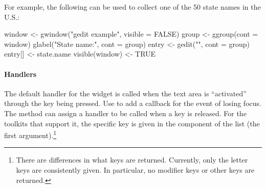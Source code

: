 For example, the following can be used to collect one of the 50 state
names in the U.S.:
\begin{Schunk}
\begin{Sinput}
 window <- gwindow("gedit example", visible = FALSE) 
 group <- ggroup(cont = window)
 glabel("State name:", cont = group)
 entry <- gedit("", cont = group)
 entry[] <- state.name
 visible(window) <- TRUE
\end{Sinput}
\end{Schunk}

\paragraph{Handlers}
The default handler for the  widget is called when
the text area is ``activated'' through the  key being
pressed. Use  to add a callback for the event of
losing focus. The  method can
assign a handler to be called when a key is released. For the toolkits
that support it, the specific key is given in the  component
of the list  (the first argument).\footnote{There are
  differences in what keys are returned. Currently, only the letter
  keys are consistently given. In particular, no modifier keys or
  other keys are returned.}

